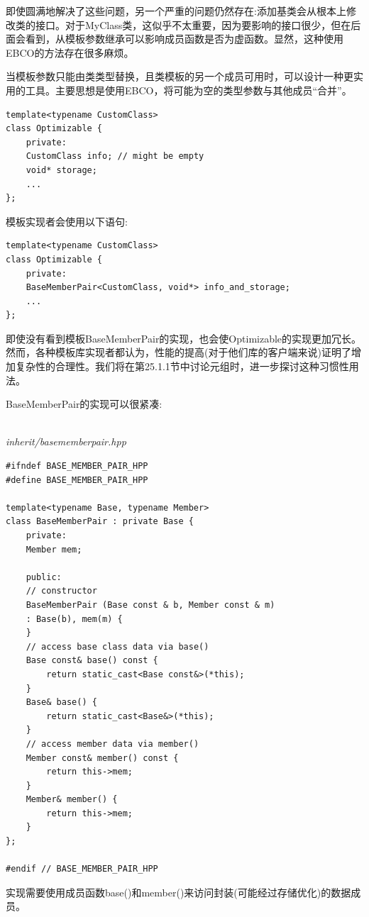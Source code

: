 即使圆满地解决了这些问题，另一个严重的问题仍然存在:添加基类会从根本上修改类的接口。对于MyClass类，这似乎不太重要，因为要影响的接口很少，但在后面会看到，从模板参数继承可以影响成员函数是否为虚函数。显然，这种使用EBCO的方法存在很多麻烦。

当模板参数只能由类类型替换，且类模板的另一个成员可用时，可以设计一种更实用的工具。主要思想是使用EBCO，将可能为空的类型参数与其他成员“合并”。

\begin{lstlisting}[style=styleCXX]
template<typename CustomClass>
class Optimizable {
	private:
	CustomClass info; // might be empty
	void* storage;
	...
};
\end{lstlisting}

模板实现者会使用以下语句:

\begin{lstlisting}[style=styleCXX]
template<typename CustomClass>
class Optimizable {
	private:
	BaseMemberPair<CustomClass, void*> info_and_storage;
	...
};
\end{lstlisting}

即使没有看到模板BaseMemberPair的实现，也会使Optimizable的实现更加冗长。然而，各种模板库实现者都认为，性能的提高(对于他们库的客户端来说)证明了增加复杂性的合理性。我们将在第25.1.1节中讨论元组时，进一步探讨这种习惯性用法。

BaseMemberPair的实现可以很紧凑:

\hspace*{\fill} \\ %
\noindent
\textit{inherit/basememberpair.hpp}
\begin{lstlisting}[style=styleCXX]
#ifndef BASE_MEMBER_PAIR_HPP
#define BASE_MEMBER_PAIR_HPP

template<typename Base, typename Member>
class BaseMemberPair : private Base {
	private:
	Member mem;
	
	public:
	// constructor
	BaseMemberPair (Base const & b, Member const & m)
	: Base(b), mem(m) {
	}
	// access base class data via base()
	Base const& base() const {
		return static_cast<Base const&>(*this);
	}
	Base& base() {
		return static_cast<Base&>(*this);
	}
	// access member data via member()
	Member const& member() const {
		return this->mem;
	}
	Member& member() {
		return this->mem;
	}
};

#endif // BASE_MEMBER_PAIR_HPP
\end{lstlisting}

实现需要使用成员函数base()和member()来访问封装(可能经过存储优化)的数据成员。





























